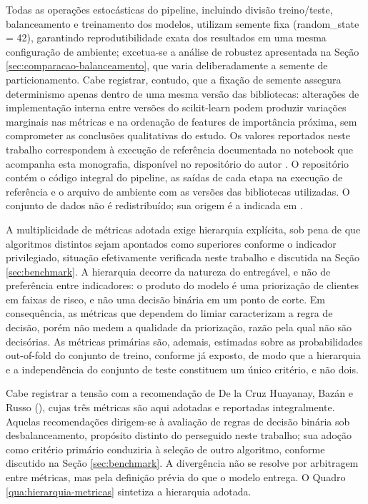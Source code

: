 Todas as operações estocásticas do pipeline, incluindo divisão treino/teste, balanceamento e treinamento dos modelos, utilizam semente fixa (random\_state = 42), garantindo reprodutibilidade exata dos resultados em uma mesma configuração de ambiente; excetua-se a análise de robustez apresentada na Seção \ref{sec:comparacao-balanceamento}, que varia deliberadamente a semente de particionamento. Cabe registrar, contudo, que a fixação de semente assegura determinismo apenas dentro de uma mesma versão das bibliotecas: alterações de implementação interna entre versões do scikit-learn \cite{pedregosa2011} podem produzir variações marginais nas métricas e na ordenação de features de importância próxima, sem comprometer as conclusões qualitativas do estudo. Os valores reportados neste trabalho correspondem à execução de referência documentada no notebook que acompanha esta monografia, disponível no repositório do autor \cite{ugulino2026}. O repositório contém o código integral do pipeline, as saídas de cada etapa na execução de referência e o arquivo de ambiente com as versões das bibliotecas utilizadas. O conjunto de dados não é redistribuído; sua origem é a indicada em .

A multiplicidade de métricas adotada exige hierarquia explícita, sob pena de que algoritmos distintos sejam apontados como superiores conforme o indicador privilegiado, situação efetivamente verificada neste trabalho e discutida na Seção \ref{sec:benchmark}. A hierarquia decorre da natureza do entregável, e não de preferência entre indicadores: o produto do modelo é uma priorização de clientes em faixas de risco, e não uma decisão binária em um ponto de corte. Em consequência, as métricas que dependem do limiar caracterizam a regra de decisão, porém não medem a qualidade da priorização, razão pela qual não são decisórias. As métricas primárias são, ademais, estimadas sobre as probabilidades out-of-fold do conjunto de treino, conforme já exposto, de modo que a hierarquia e a independência do conjunto de teste constituem um único critério, e não dois.

Cabe registrar a tensão com a recomendação de De la Cruz Huayanay, Bazán e Russo (\citeyear{delacruz2025}), cujas três métricas são aqui adotadas e reportadas integralmente. Aquelas recomendações dirigem-se à avaliação de regras de decisão binária sob desbalanceamento, propósito distinto do perseguido neste trabalho; sua adoção como critério primário conduziria à seleção de outro algoritmo, conforme discutido na Seção \ref{sec:benchmark}. A divergência não se resolve por arbitragem entre métricas, mas pela definição prévia do que o modelo entrega. O Quadro \ref{qua:hierarquia-metricas} sintetiza a hierarquia adotada.

\FloatBarrier
